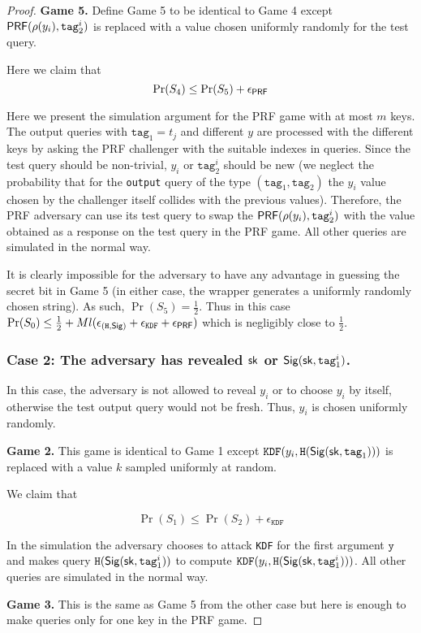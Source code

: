 \documentclass{article}
\begin{document}
\begin{proof}
\noindent \textbf{Game 5.} Define Game 5 to be identical to Game 4 except $\mathsf{PRF}(\rho(y_i), \texttt{tag}^i_2)$ is replaced with a value chosen uniformly randomly for the test query.

Here we claim that
$$
\Pr(S_4) \le \Pr(S_5) + \epsilon_{\mathsf{PRF}}
$$

Here we present the simulation argument for the PRF game with at most $m$ keys. The output queries with $\texttt{tag}_1 =t_j$ and different $y$ are processed with the different keys by asking the PRF challenger with the suitable indexes in queries. Since the test query should be non-trivial, $y_i$ or $\texttt{tag}_2^i$ should be new (we neglect the probability that for the \texttt{output} query of the type $(\texttt{tag}_1,\texttt{tag}_2)$ the $y_i$ value chosen by the challenger itself collides with the previous values). Therefore, the PRF adversary can use its test query to swap the $\mathsf{PRF}(\rho(y_i), \texttt{tag}^i_2)$ with the value obtained as a response on the test query in the PRF game. All other queries are simulated in the normal way.
 
It is clearly impossible for the adversary to have any advantage in guessing the secret bit in Game 5 (in either case, the wrapper generates a uniformly randomly chosen string). As such, $\Pr(S_5) = \frac{1}{2}$. Thus in this case $\Pr(S_0) \le \frac{1}{2} + Ml( \epsilon_{(\texttt{H}, \mathsf{Sig})} + \epsilon_{\texttt{KDF}} + \epsilon_{\mathsf{PRF}})$ which is negligibly close to $\frac{1}{2}$.

\subsubsection*{Case 2: The adversary has revealed $\mathsf{sk}$ or $\mathsf{Sig}(\mathsf{sk}, \texttt{tag}_1^i)$.}

In this case, the adversary is not allowed to reveal $y_i$ or to choose $y_i$ by itself, otherwise the test output query would not be fresh. Thus, $y_i$ is chosen uniformly randomly.  


\noindent \textbf{Game 2.} This game is identical to Game 1 except $\texttt{KDF}(y_i, \texttt{H}(\mathsf{Sig} (\mathsf{sk}, \texttt{tag}_1)))$ is replaced with a value $k$ sampled uniformly at random. 

We claim that 

$$
\Pr(S_1) \le \Pr(S_2) + \epsilon_{\texttt{KDF}}
$$

In the simulation the adversary chooses to attack \texttt{KDF} for the first argument $\texttt{y}$ and makes query  $\texttt{H}(\mathsf{Sig} (\mathsf{sk}, \texttt{tag}^i_1))$ to compute $\texttt{KDF}(y_i, \texttt{H}(\mathsf{Sig} (\mathsf{sk}, \texttt{tag}^i_1)))$. All other queries are simulated in the normal way.

\noindent \textbf{Game 3.} This is the same as Game 5 from the other case but here is enough to make queries only for one key in the PRF game.
\end{proof}
\end{document}
